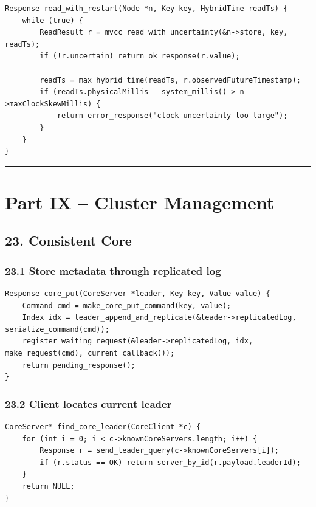 \documentclass[10pt,letterpaper]{article}
\begin{document}
\begin{verbatim}
Response read_with_restart(Node *n, Key key, HybridTime readTs) {
    while (true) {
        ReadResult r = mvcc_read_with_uncertainty(&n->store, key, readTs);
        if (!r.uncertain) return ok_response(r.value);

        readTs = max_hybrid_time(readTs, r.observedFutureTimestamp);
        if (readTs.physicalMillis - system_millis() > n->maxClockSkewMillis) {
            return error_response("clock uncertainty too large");
        }
    }
}
\end{verbatim}

\medskip\hrule\medskip

\clearpage
\section*{Part IX -- Cluster Management}

\subsection*{23. Consistent Core}

\subsubsection*{23.1 Store metadata through replicated log}

\begin{verbatim}
Response core_put(CoreServer *leader, Key key, Value value) {
    Command cmd = make_core_put_command(key, value);
    Index idx = leader_append_and_replicate(&leader->replicatedLog, serialize_command(cmd));
    register_waiting_request(&leader->replicatedLog, idx, make_request(cmd), current_callback());
    return pending_response();
}
\end{verbatim}

\subsubsection*{23.2 Client locates current leader}

\begin{verbatim}
CoreServer* find_core_leader(CoreClient *c) {
    for (int i = 0; i < c->knownCoreServers.length; i++) {
        Response r = send_leader_query(c->knownCoreServers[i]);
        if (r.status == OK) return server_by_id(r.payload.leaderId);
    }
    return NULL;
}
\end{verbatim}
\end{document}
